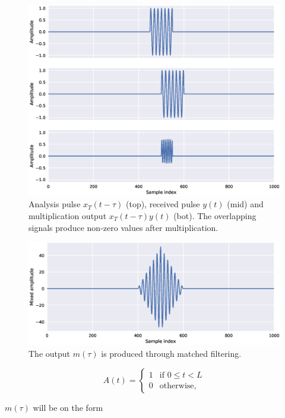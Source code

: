 \begin{figure}[t]
	\centering
	\includegraphics[scale=0.5]{figs_temp/mixing1}
	\caption{Analysis pulse $x_T(t-\tau)$ (top), received pulse $y(t)$ (mid) and multiplication output $x_T(t-\tau)y(t)$ (bot). The overlapping signals produce non-zero values after multiplication.}
	\label{fig:mix1}
\end{figure}

\begin{figure}[t]
	\centering
	\includegraphics[scale=0.5]{figs_temp/mixing2}
	\caption{The output $m(\tau)$ is produced through matched filtering.}
	\label{fig:mix2}
\end{figure}
\begin{equation}
	A(t) = \begin{cases}
		1 & \text{if $0\leq t < L$} \\
		0 & \text{otherwise},
	\end{cases}
\end{equation}

$m(\tau)$ will be on the form 


